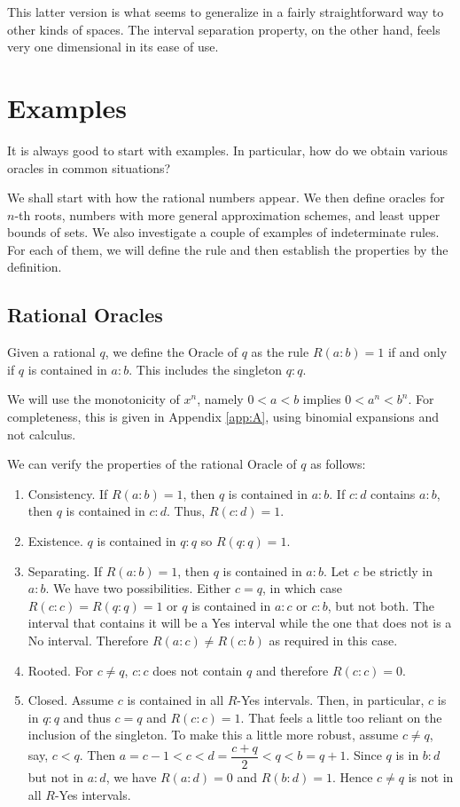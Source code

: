 \documentclass[12pt]{article}
\theoremstyle{remark}
\begin{document}
This latter version is what seems to generalize in a fairly straightforward way to other kinds of spaces. The interval separation property, on the other hand, feels very one dimensional in its ease of use. 

\section{Examples}

It is always good to start with examples. In particular, how do we obtain various oracles in common situations? 

We shall start with how the rational numbers appear. We then define oracles for $n$-th roots,  numbers with more general approximation schemes, and least upper bounds of sets. We also investigate a couple of examples of indeterminate rules. For each of them, we will define the rule and then establish the properties by the definition. 

\subsection{Rational Oracles}

Given a rational $q$, we define the Oracle of $q$ as the rule $R(a:b) = 1$ if and only if $q$ is contained in $a:b$. This includes the singleton $q:q$.  

We will use the monotonicity of $x^n$, namely $ 0 < a < b$ implies $0 < a^n < b^n$. For completeness, this is given in Appendix \ref{app:A}, using binomial expansions and not calculus. 

We can verify the properties of the rational Oracle of $q$ as follows: 

\begin{enumerate}
    \item Consistency. If $R(a:b)=1$, then $q$ is contained in $a:b$. If $c:d$ contains $a:b$, then $q$ is contained in $c:d$. Thus, $R(c:d)=1$.
    \item Existence. $q$ is contained in $q:q$ so $R(q:q)=1$.
    \item Separating. If $R(a:b) =1$, then $q$ is contained in $a:b$. Let $c$ be strictly in $a:b$. We have two possibilities. Either $c = q$, in which case $R(c:c)=R(q:q)=1$ or $q$ is contained in $a:c$ or $c:b$, but not both. The interval that contains it will be a Yes interval while the one that does not is a No interval. Therefore $R(a:c) \neq R(c:b)$ as required in this case. 
    \item Rooted. For $c \neq q$, $c:c$ does not contain $q$ and therefore $R(c:c)=0$.
    \item Closed. Assume $c$ is contained in all $R$-Yes intervals. Then, in particular, $c$ is in $q:q$ and thus $c=q$ and $R(c:c)=1$. That feels a little too reliant on the inclusion of the singleton. To make this a little more robust, assume $c \neq q$, say, $c < q$. Then  $a=c-1 < c < d=\dfrac{c+q}{2} < q < b=q+1$. Since $q$ is in $b:d$ but not in $a:d$, we have $R(a:d)=0$ and $R(b:d)=1$. Hence $c \neq q$ is not in all $R$-Yes intervals.
\end{enumerate}
\end{document}
